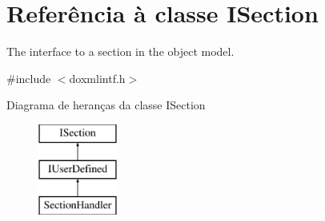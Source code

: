 \hypertarget{class_i_section}{\section{Referência à classe I\-Section}
\label{class_i_section}
}


The interface to a section in the object model.  




{\ttfamily \#include $<$doxmlintf.\-h$>$}

Diagrama de heranças da classe I\-Section\begin{figure}[H]
\begin{center}
\leavevmode
\includegraphics[height=3.000000cm]{class_i_section}
\end{center}
\end{figure}

